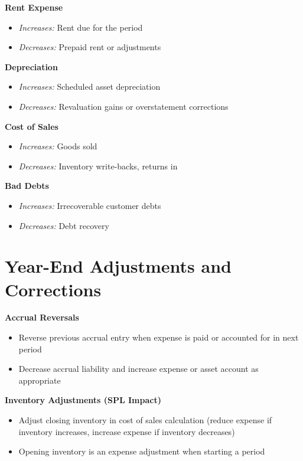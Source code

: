 \textbf{Rent Expense}
\begin{itemize}
    \item \textit{Increases:} Rent due for the period
    \item \textit{Decreases:} Prepaid rent or adjustments
\end{itemize}

\textbf{Depreciation}
\begin{itemize}
    \item \textit{Increases:} Scheduled asset depreciation
    \item \textit{Decreases:} Revaluation gains or overstatement corrections
\end{itemize}

\textbf{Cost of Sales}
\begin{itemize}
    \item \textit{Increases:} Goods sold
    \item \textit{Decreases:} Inventory write-backs, returns in
\end{itemize}

\textbf{Bad Debts}
\begin{itemize}
    \item \textit{Increases:} Irrecoverable customer debts
    \item \textit{Decreases:} Debt recovery
\end{itemize}

\section*{Year-End Adjustments and Corrections}

\textbf{Accrual Reversals}
\begin{itemize}
    \item Reverse previous accrual entry when expense is paid or accounted for in next period
    \item Decrease accrual liability and increase expense or asset account as appropriate
\end{itemize}

\textbf{Inventory Adjustments (SPL Impact)}
\begin{itemize}
    \item Adjust closing inventory in cost of sales calculation (reduce expense if inventory increases, increase expense if inventory decreases)
    \item Opening inventory is an expense adjustment when starting a period
\end{itemize}

